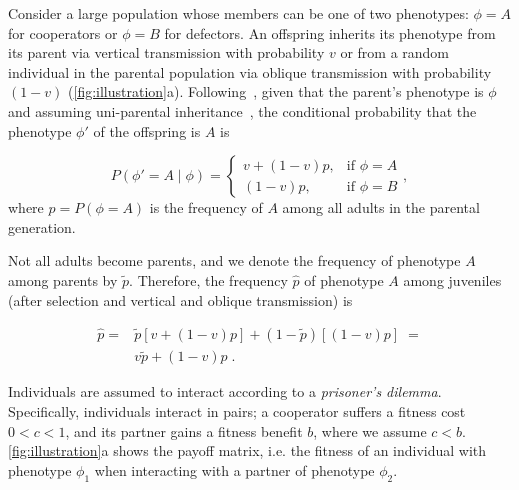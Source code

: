 \documentclass[12pt]{extarticle}
\begin{document}
Consider a large population whose members can be one of two phenotypes: $\phi=A$ for cooperators or $\phi=B$ for defectors.
An offspring inherits its phenotype from its parent via vertical transmission with probability $v$ or from a random individual in the parental population via oblique transmission with probability $(1-v)$ (\autoref{fig:illustration}a). 
Following~\citet{ram2018evolution}, given that the parent's phenotype is $\phi$ and assuming uni-parental inheritance~\citep{Zefferman2016}, the conditional probability that the phenotype $\phi'$ of the offspring is $A$ is 

\begin{equation} \label{eq:vertical_oblique_transmission}
P(\phi'=A \mid \phi) = \begin{cases}
v + (1-v)p, & \text{if } \phi=A \\
(1-v)p, & \text{if } \phi=B
\end{cases},
\end{equation}
where $p=P(\phi=A)$ is the frequency of $A$ among all adults in the parental generation.  

Not all adults become parents, and we denote the frequency of phenotype $A$ among parents by $\tilde{p}$.
Therefore, the frequency $\hat{p}$ of  phenotype $A$ among juveniles (after selection and vertical and oblique transmission) is

\begin{equation}\label{eq:horizontal}
\begin{aligned}
\hat{p} =
& \tilde{p} [v + (1-v)p] + (1-\tilde{p}) [(1-v)p] \;= \\
& v \tilde{p} + (1-v) p \;.
\end{aligned}
\end{equation}

Individuals are assumed to interact according to a \emph{prisoner's dilemma}.
Specifically, individuals interact in pairs; a cooperator suffers a fitness cost $0<c<1$, and its partner gains a fitness benefit $b$, where we assume $c<b$. \autoref{fig:illustration}a shows the payoff matrix, i.e. the fitness of an individual with phenotype $\phi_1$ when interacting with a partner of phenotype $\phi_2$.
\end{document}
